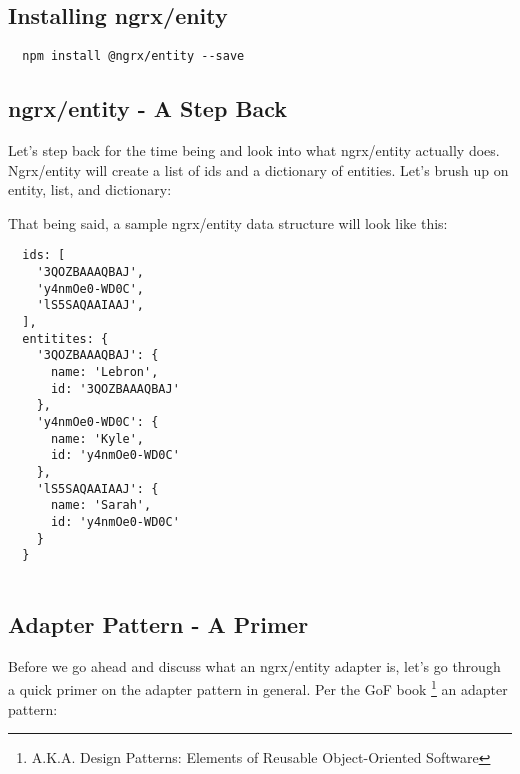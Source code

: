 \subsection{ Installing ngrx/enity }
\begin{verbatim}
  npm install @ngrx/entity --save
\end{verbatim}

\subsection{ ngrx/entity - A Step Back }
Let's step back for the time being and look into what ngrx/entity actually does.
Ngrx/entity will create a list of ids and a dictionary of entities. Let's brush
up on entity, list, and dictionary:

That being said, a sample ngrx/entity data structure will look like this:
\begin{verbatim}
  ids: [
    '3QOZBAAAQBAJ',
    'y4nmOe0-WD0C',
    'lS5SAQAAIAAJ',
  ],
  entitites: {
    '3QOZBAAAQBAJ': {
      name: 'Lebron',
      id: '3QOZBAAAQBAJ'
    },
    'y4nmOe0-WD0C': {
      name: 'Kyle',
      id: 'y4nmOe0-WD0C'
    },
    'lS5SAQAAIAAJ': {
      name: 'Sarah',
      id: 'y4nmOe0-WD0C'
    }
  }


\end{verbatim}

\subsection{ Adapter Pattern - A Primer  }
Before we go ahead and discuss what an ngrx/entity adapter is, let's go through
a quick primer on the adapter pattern in general. Per the GoF book
\footnote{A.K.A. Design Patterns: Elements of Reusable Object-Oriented Software}
an adapter pattern:



